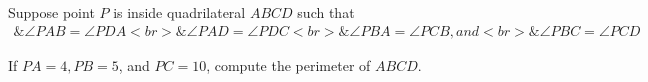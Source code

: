 Suppose point $P$ is inside quadrilateral $A B C D$ such that
$$\begin{aligned}

\& \angle P A B=\angle P D A <br>
\& \angle P A D=\angle P D C <br>
\& \angle P B A=\angle P C B, and <br>
\& \angle P B C=\angle P C D

\end{aligned}$$

If $P A=4, P B=5$, and $P C=10$, compute the perimeter of $A B C D$.
